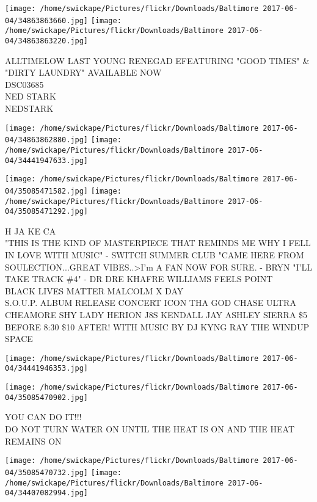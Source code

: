 \documentclass[10pt,letterpaper]{article}
\begin{document}
\texttt{[image: /home/swickape/Pictures/flickr/Downloads/Baltimore 2017-06-04/34863863660.jpg]}
\texttt{[image: /home/swickape/Pictures/flickr/Downloads/Baltimore 2017-06-04/34863863220.jpg]}

ALLTIMELOW LAST YOUNG RENEGAD EFEATURING "GOOD TIMES" \& "DIRTY LAUNDRY" AVAILABLE NOW\\
DSC03685\\
NED STARK\\
NEDSTARK\\
\pagebreak

\texttt{[image: /home/swickape/Pictures/flickr/Downloads/Baltimore 2017-06-04/34863862880.jpg]}
\texttt{[image: /home/swickape/Pictures/flickr/Downloads/Baltimore 2017-06-04/34441947633.jpg]}

\texttt{[image: /home/swickape/Pictures/flickr/Downloads/Baltimore 2017-06-04/35085471582.jpg]}
\texttt{[image: /home/swickape/Pictures/flickr/Downloads/Baltimore 2017-06-04/35085471292.jpg]}

H JA KE CA\\
"THIS IS THE KIND OF MASTERPIECE THAT REMINDS ME WHY I FELL IN LOVE WITH MUSIC" {-} SWITCH SUMMER CLUB "CAME HERE FROM SOULECTION...GREAT VIBES..>I'm A FAN NOW FOR SURE.  {-} BRYN "I'LL TAKE TRACK \#4" {-} DR DRE KHAFRE WILLIAMS FEELS POINT\\
BLACK LIVES MATTER MALCOLM X DAY\\
S.O.U.P. ALBUM RELEASE CONCERT ICON THA GOD CHASE ULTRA CHEAMORE SHY LADY HERION J8S KENDALL JAY ASHLEY SIERRA \$5 BEFORE 8:30 \$10 AFTER!  WITH MUSIC BY DJ KYNG RAY THE WINDUP SPACE\\
\pagebreak

\texttt{[image: /home/swickape/Pictures/flickr/Downloads/Baltimore 2017-06-04/34441946353.jpg]}

\vspace{0.25in}
\texttt{[image: /home/swickape/Pictures/flickr/Downloads/Baltimore 2017-06-04/35085470902.jpg]}

YOU CAN DO IT!!!\\
DO NOT TURN WATER ON UNTIL THE HEAT IS ON AND THE HEAT REMAINS ON\\
\pagebreak

\texttt{[image: /home/swickape/Pictures/flickr/Downloads/Baltimore 2017-06-04/35085470732.jpg]}
\texttt{[image: /home/swickape/Pictures/flickr/Downloads/Baltimore 2017-06-04/34407082994.jpg]}
\end{document}
